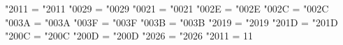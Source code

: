 
\lccode "2011 = "2011	%
\lccode "0029 = "0029
\lccode "0021 = "0021
\lccode "002E = "002E
\lccode "002C = "002C
\lccode "003A = "003A
\lccode "003F = "003F
\lccode "003B = "003B
\lccode "2019 = "2019
\lccode "201D = "201D
\lccode "200C = "200C
\lccode "200D = "200D
\lccode "2026 = "2026
\catcode "2011 = 11	%
